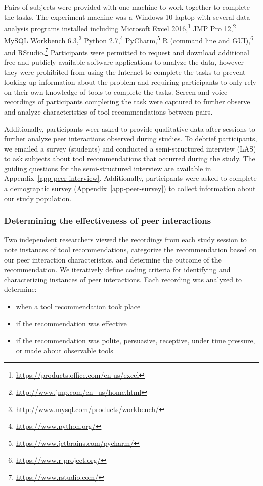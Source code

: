 Pairs of subjects were provided with one machine to work together to complete the tasks. The experiment machine was a Windows 10 laptop with several data analysis programs installed including Microsoft Excel 2016,\footnote{\url{https://products.office.com/en-us/excel}} JMP Pro 12,\footnote{\url{http://www.jmp.com/en_us/home.html}} MySQL Workbench 6.3,\footnote{\url{http://www.mysql.com/products/workbench/}} Python 2.7,\footnote{\url{https://www.python.org/}} PyCharm,\footnote{\url{https://www.jetbrains.com/pycharm/}} R (command line and GUI),\footnote{\url{https://www.r-project.org/}} and RStudio.\footnote{\url{https://www.rstudio.com/}} Participants were permitted to request and download additional free and publicly available software applications to analyze the data, however they were prohibited from using the Internet to complete the tasks to prevent looking up information about the problem and requiring participants to only rely on their own knowledge of tools to complete the tasks. Screen and voice recordings of participants completing the task were captured to further observe and analyze characteristics of tool recommendations between pairs. 

Additionally, participants weer asked to provide qualitative data after sessions to further analyze peer interactions observed during studies. To debrief participants, we emailed a survey (students) and conducted a semi-structured interview (LAS) to ask subjects about tool recommendations that occurred during the study. The guiding questions for the semi-structured interview are available in Appendix~\ref{app-peer-interview}. Additionally, participants were asked to complete a demographic survey (Appendix~\ref{app-peer-survey}) to collect information about our study population.


\subsubsection{Determining the effectiveness of peer interactions} 

Two independent researchers viewed the recordings from each study session to note instances of tool recommendations, categorize the recommendation based on our peer interaction characteristics, and determine the outcome of the recommendation. We iteratively define coding criteria for identifying and characterizing instances of peer interactions. Each recording was analyzed to determine:
\begin{itemize}[topsep=0pt,itemsep=-1ex,partopsep=1ex,parsep=1ex]
    \item when a tool recommendation took place
    \item if the recommendation was effective
    \item if the recommendation was polite, persuasive, receptive, under time pressure, or made about observable tools
\end{itemize}

